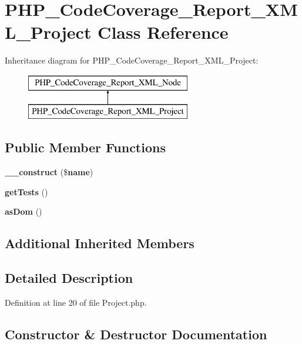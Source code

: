 \section{P\+H\+P\+\_\+\+Code\+Coverage\+\_\+\+Report\+\_\+\+X\+M\+L\+\_\+\+Project Class Reference}
\label{class_p_h_p___code_coverage___report___x_m_l___project}
Inheritance diagram for P\+H\+P\+\_\+\+Code\+Coverage\+\_\+\+Report\+\_\+\+X\+M\+L\+\_\+\+Project\+:\begin{figure}[H]
\begin{center}
\leavevmode
\includegraphics[height=2.000000cm]{class_p_h_p___code_coverage___report___x_m_l___project}
\end{center}
\end{figure}
\subsection*{Public Member Functions}
\begin{DoxyCompactItemize}
\item 
{\bf \+\_\+\+\_\+construct} (\${\bf name})
\item 
{\bf get\+Tests} ()
\item 
{\bf as\+Dom} ()
\end{DoxyCompactItemize}
\subsection*{Additional Inherited Members}


\subsection{Detailed Description}


Definition at line 20 of file Project.\+php.



\subsection{Constructor \& Destructor Documentation}
